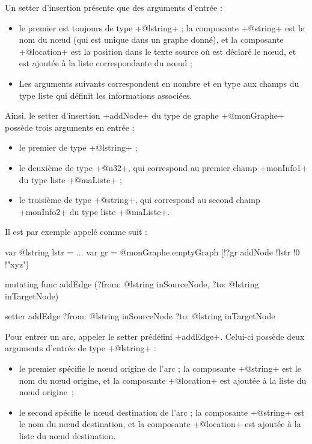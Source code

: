 Un setter d'insertion présente que des arguments d'entrée :
\begin{itemize}
  \item le premier est toujours de type \ggsq+@lstring+ ; la composante \ggsq+@string+ est le nom du nœud (qui est unique dans un graphe donné), et la composante \ggsq+@location+ est la position dans le texte source où est déclaré le nœud, et est ajoutée à la liste correspondante du nœud ;
  \item Les arguments suivants correspondent en nombre et en type aux champs du type liste qui définit les informations associées.
\end{itemize}

Ainsi, le setter d'insertion \ggsq+addNode+ du type de graphe \ggsq+@monGraphe+ possède trois arguments en entrée ;
\begin{itemize}
  \item le premier de type \ggsq+@lstring+ ;
  \item le deuxième de type \ggsq+@u32+, qui correspond au premier champ \ggsq+monInfo1+ du type liste \ggsq+@maListe+ ;
  \item le troisième de type \ggsq+@string+, qui correspond au second champ \ggsq+monInfo2+ du type liste \ggsq+@maListe+.
\end{itemize}

Il est par exemple appelé comme suit :
\begin{galgas4}
var @lstring lstr = ...
var gr = @monGraphe.emptyGraph
[!?gr addNode !lstr !0 !"xyz"]
\end{galgas4}





\begin{galgas4}
mutating func addEdge (?from: @lstring inSourceNode, ?to: @lstring inTargetNode)
\end{galgas4}

\begin{galgas4}
setter addEdge ?from: @lstring inSourceNode ?to: @lstring inTargetNode
\end{galgas4}

Pour entrer un arc, appeler le setter prédéfini \ggsq+addEdge+. Celui-ci possède deux arguments d'entrée de type \ggsq+@lstring+ :
\begin{itemize}
  \item le premier spécifie le nœud origine de l'arc ; la composante \ggsq+@string+ est le nom du nœud origine, et la composante \ggsq+@location+ est ajoutée à la liste du nœud origine~;
  \item le second spécifie le nœud destination de l'arc ; la composante \ggsq+@string+ est le nom du nœud destination, et la composante \ggsq+@location+ est ajoutée à la liste du nœud destination.
\end{itemize}








